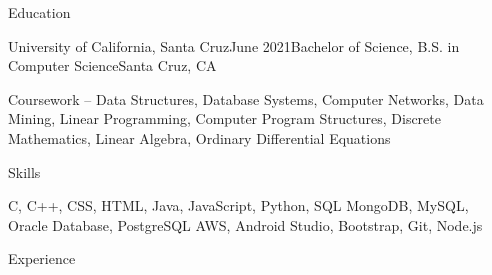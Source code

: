 \documentclass[fontsize=11pt,fontface=cormorantgaramond,fitpage]{cvtemplate}
\begin{document}
\begin{cvtext}





\begin{cvsection}{Education}


  \begin{cvsubsection}
    {University of California, Santa Cruz}{June 2021}{Bachelor of Science, B.S. in Computer Science}{Santa Cruz, CA}

    \listitem Coursework -- Data Structures, Database Systems, Computer
    Networks, Data Mining, Linear  Programming, Computer Program Structures, Discrete Mathematics, Linear Algebra, Ordinary Differential Equations

  \end{cvsubsection}

\end{cvsection}


\begin{cvsection}{Skills}


  \descitem[Languages] C, C++, CSS, HTML, Java, JavaScript, Python, SQL
  \descitem[Databases] MongoDB, MySQL, Oracle Database, PostgreSQL
  \descitem[Utilities] AWS, Android Studio, Bootstrap, Git, Node.js

\end{cvsection}


\begin{cvsection}{Experience}



\end{cvsection}
\end{cvtext}
\end{document}
